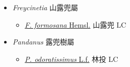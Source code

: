 
  \begin{itemize}
 \item[] \textit{Freycinetia} 山露兜屬
                    
  \begin{itemize}
        \item[] \href{http://www.theplantlist.org/tpl1.1/search?q=Freycinetia+formosana}{\textit{F. formosana} Hemsl.}   山露兜 LC
  \end{itemize}
 \item[] \textit{Pandanus} 露兜樹屬
                    
  \begin{itemize}
        \item[] \href{http://www.theplantlist.org/tpl1.1/search?q=Pandanus+odoratissimus}{\textit{P. odoratissimus} L.f.}   林投 LC
  \end{itemize}
  \end{itemize}

